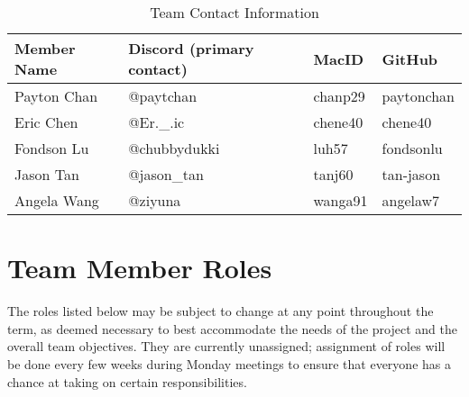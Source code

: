 \documentclass{article}
\begin{document}
\begin{table}[h!]
\centering
\caption{Team Contact Information}
\begin{tabular}{|l|l|l|l|}
\hline
\textbf{Member Name} & \textbf{Discord (primary contact)} & \textbf{MacID} &
\textbf{GitHub} \\ 
\hline
 Payton Chan   & @paytchan    & chanp29  & paytonchan \\ 
\hline
 Eric Chen     & @Er.\_.ic     & chene40  & chene40    \\ 
\hline 
Fondson Lu    & @chubbydukki & luh57    & fondsonlu  \\ 
\hline
Jason Tan     & @jason\_tan  & tanj60   & tan-jason  \\ 
\hline 
Angela Wang   & @ziyuna      & wanga91  & angelaw7   \\
\hline
\end{tabular}
\end{table}

\newpage

\section{Team Member Roles}
The roles listed below may be subject to change at any point throughout the
term, as deemed necessary to best accommodate the needs of the project and the
overall team objectives. They are currently unassigned; assignment of roles will
be done every few weeks during Monday meetings to ensure that everyone has a
chance at taking on certain responsibilities.
\end{document}
